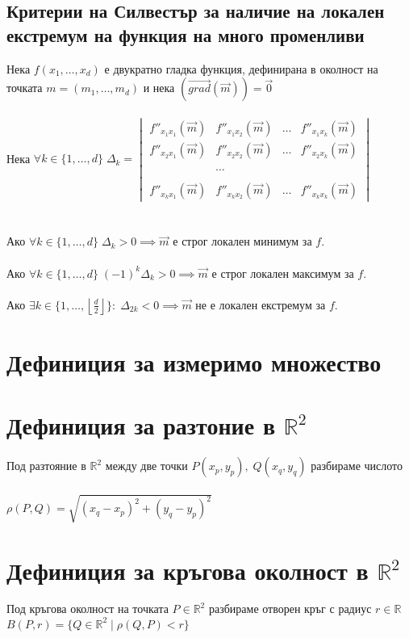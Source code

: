 \documentclass[14pt]{extarticle}
\newcommand{\R}{\mathbb{R}}
\newcommand{\Vector}[1]{\overrightarrow{#1}}
\begin{document}
\subsection*{Критерии на Силвестър за наличие на локален екстремум на функция на много променливи}
Нека \(f(x_1, \dots, x_d)\) е двукратно гладка функция, дефинирана в околност на точката \(m = (m_1, \dots, m_d)\) и нека \((\Vector{grad}(\Vector{m})) = \Vector{0}\) \\\\
Нека \(\forall k \in \{1, \dots, d\} \; \Delta_k = \begin{vmatrix}
f''_{x_1x_1}(\Vector{m}) & f''_{x_1x_2}(\Vector{m}) & \dots & f''_{x_1x_k}(\Vector{m}) \\
f''_{x_2x_1}(\Vector{m}) & f''_{x_2x_2}(\Vector{m}) & \dots & f''_{x_2x_k}(\Vector{m}) \\
~ \\
 ~ &  \cdots & ~ \\
~ \\
f''_{x_kx_1}(\Vector{m}) & f''_{x_kx_2}(\Vector{m}) & \dots & f''_{x_kx_k}(\Vector{m})
\end{vmatrix} \) \\\\\\
Ако \(\forall k \in \{1, \dots, d\} \; \Delta_k > 0 \implies \Vector{m}\) е строг локален минимум за \(f\). \\\\
Ако \(\forall k \in \{1, \dots, d\} \; (-1)^k\Delta_k > 0 \implies \Vector{m}\) е строг локален максимум за \(f\). \\\\
Ако \(\exists k \in \{1, \dots, \left\lfloor \frac{d}{2} \right\rfloor\} : \; \Delta_{2k} < 0 \implies \Vector{m}\) не е локален екстремум за \(f\).
\section*{Дефиниция за измеримо множество}
\section*{Дефиниция за разтоние в \(\R^2\)}
Под разтояние в \(\R^2\) между две точки \(P(x_p, y_p), \; Q(x_q, y_q)\) разбираме числото \\\\
\(\rho(P, Q) = \sqrt{(x_q - x_p)^2 + (y_q - y_p)^2}\)
\section*{Дефиниция за кръгова околност в \(\R^2\)}
Под кръгова околност на точката \(P \in \R^2\) разбираме отворен кръг с радиус \(r \in \R\) \(B(P, r) = \{Q \in \R^2 \; | \; \rho(Q, P) < r\}\)
\end{document}
